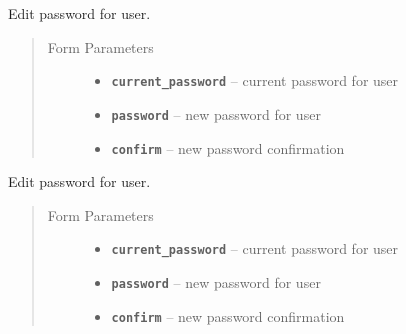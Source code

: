 \documentclass[letterpaper,10pt,english]{sphinxmanual}
\begin{document}
\begin{fulllineitems}
\label{users:get--user-edit-profile-security}
Edit password for user.
\begin{quote}\begin{description}
\item[{Form Parameters}] \leavevmode\begin{itemize}
\item {} 
\textbf{\texttt{current\_password}} -- current password for user

\item {} 
\textbf{\texttt{password}} -- new password for user

\item {} 
\textbf{\texttt{confirm}} -- new password confirmation

\end{itemize}

\end{description}\end{quote}

\end{fulllineitems}



\begin{fulllineitems}
\label{users:post--user-edit-profile-security}
Edit password for user.
\begin{quote}\begin{description}
\item[{Form Parameters}] \leavevmode\begin{itemize}
\item {} 
\textbf{\texttt{current\_password}} -- current password for user

\item {} 
\textbf{\texttt{password}} -- new password for user

\item {} 
\textbf{\texttt{confirm}} -- new password confirmation

\end{itemize}

\end{description}\end{quote}

\end{fulllineitems}
\end{document}
